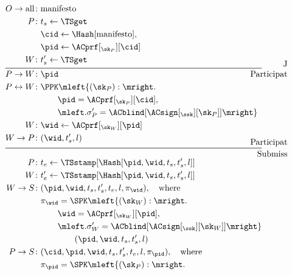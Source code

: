 \begin{columns}[t]
\begin{column}{0.32\linewidth}
    \begin{figure}
      \centering
      \begin{minipage}{\linewidth}
        \begin{align*}
          O\to \text{all}\colon & \text{manifesto} \\
          P\colon & t_s\gets \TSget \\
          & \cid\gets \Hash[\text{manifesto}], \\
          & \pid\gets \ACprf[_{\sk_P}][\cid] \\
          W\colon & t_s'\gets \TSget
          \\[-1em]
          \noalign{\hfill Join}
          \midrule
          \noalign{\hfill Participation}
          \\[-3em]
          P\to W\colon & \pid \\
          P\leftrightarrow W\colon &
          \PPK\mleft\{ (\sk_P) : \mright. \\
          & \qquad \pid = \ACprf[_{\sk_P}][\cid], \\
          & \qquad \mleft. \sigma_P' = \ACblind[\ACsign[_{\ssk}][\sk_P]] \mright\} 
          \\
          W\colon & \wid\gets \ACprf[_{\sk_W}][\pid] \\
          W\to P\colon & (\wid, t_s', l)
          \\[-1em]
          \noalign{\hfill Participation}
          \midrule
          \noalign{\hfill Submission}
          \\[-2em]
          P\colon & t_e\gets \TSstamp[\Hash[\pid, \wid, t_s, t_s', l]] \\
          W\colon & t_e'\gets \TSstamp[\Hash[\pid, \wid, t_s, t_s', l]] \\
          W\to S\colon & (\pid, \wid, t_s, t_s', t_e, l, \pi_{\wid}),\quad 
          \text{where} \\
          & \pi_{\wid} = \SPK\mleft\{ (\sk_W) : \mright. \\
          & \qquad \wid = \ACprf[_{\sk_W}][\pid], \\
          & \qquad \mleft. \sigma_W' = \ACblind[\ACsign[_{\ssk}][\sk_W]]\mright\} 
          \\
          & \qquad\qquad (\pid, \wid, t_s, t_s', l) \\
          P\to S\colon & (\cid, \pid, \wid, t_s, t_s', t_e, l, \pi_{\pid}),\quad 
          \text{where}\\
          & \pi_{\pid} = \SPK\mleft\{ (\sk_P) : \mright. \\

\end{align*}
\end{minipage}
\end{figure}
\end{column}
\end{columns}
